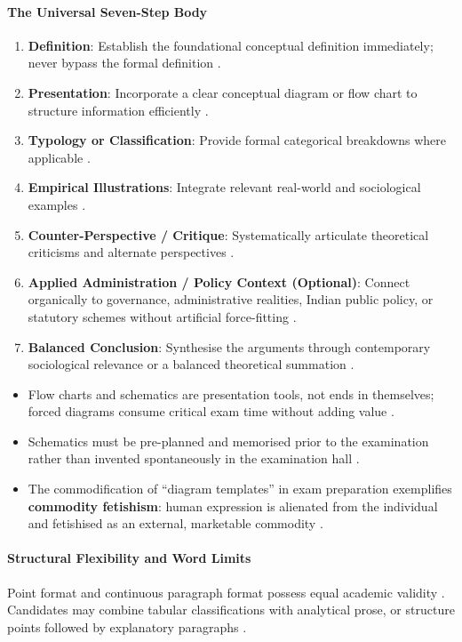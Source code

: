 \paragraph{The Universal Seven-Step Body}
\begin{enumerate}
    \item \textbf{Definition}: Establish the foundational conceptual definition immediately; never bypass the formal definition .
    \item \textbf{Presentation}: Incorporate a clear conceptual diagram or flow chart to structure information efficiently .
    \item \textbf{Typology or Classification}: Provide formal categorical breakdowns where applicable .
    \item \textbf{Empirical Illustrations}: Integrate relevant real-world and sociological examples .
    \item \textbf{Counter-Perspective / Critique}: Systematically articulate theoretical criticisms and alternate perspectives .
    \item \textbf{Applied Administration / Policy Context (Optional)}: Connect organically to governance, administrative realities, Indian public policy, or statutory schemes without artificial force-fitting .
    \item \textbf{Balanced Conclusion}: Synthesise the arguments through contemporary sociological relevance or a balanced theoretical summation .
\end{enumerate}

\begin{CriticalPoint}
\begin{itemize}
    \item Flow charts and schematics are presentation tools, not ends in themselves; forced diagrams consume critical exam time without adding value .
    \item Schematics must be pre-planned and memorised prior to the examination rather than invented spontaneously in the examination hall .
    \item The commodification of ``diagram templates'' in exam preparation exemplifies \textbf{commodity fetishism}: human expression is alienated from the individual and fetishised as an external, marketable commodity .
\end{itemize}
\end{CriticalPoint}

\paragraph{Structural Flexibility and Word Limits}
Point format and continuous paragraph format possess equal academic validity . Candidates may combine tabular classifications with analytical prose, or structure points followed by explanatory paragraphs .

